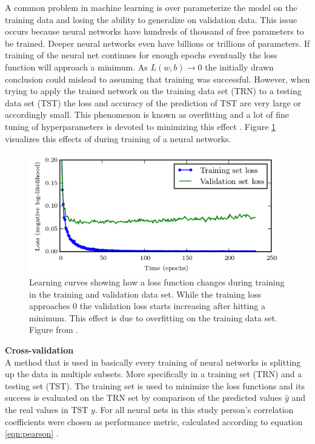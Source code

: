 A common problem in machine learning is over parameterize the model on the training data and losing
the ability to generalize on validation data. This issue occurs because neural networks have
hundreds of thousand of free parameters to be trained. Deeper neural networks even have billions or
trillions of parameters. If training of the neural net continues for enough epochs eventually the
loss function will approach a minimum. As $ L(w,b) \rightarrow 0 $ the initially drawn conclusion
could mislead to assuming that training was successful. However, when trying to apply the trained
network on the training data set (TRN) to a testing data set (TST) the loss and accuracy of the
prediction of TST are very large or accordingly small. This phenomenon is known as overfitting and a
lot of fine tuning of hyperparameters is devoted to minimizing this effect
\cite{tetko1995neural}. Figure \ref{fig:overfitting} visualizes this effects of during training
\cite{goodfellow2016deep} of a neural networks.

\begin{figure}[H]
  \centering \includegraphics[height=.35\textheight, width=1.1\textwidth]{Figures/overfitting} \decoRule
  \caption[Training vs. validation loss over time]{Learning curves showing how a loss function
    changes during training in the training and validation data set. While the training loss
    approaches 0 the validation loss starts increasing after hitting a minimum. This effect is due
    to overfitting on the training data set. Figure from \cite{goodfellow2016deep}.}
 \label{fig:overfitting}
\end{figure}

\textbf{Cross-validation} \\

A method that is used in basically every training of neural networks is splitting up the data in
multiple subsets. More specifically in a training set (TRN) and a testing set (TST). The training
set is used to minimize the loss functions and its success is evaluated on the TRN set by comparison
of the predicted values $\hat{y}$ and the real values in TST $y$. For all neural nets in this study
person's correlation coefficients were chosen as performance metric, calculated according to
equation \ref{eqn:pearson} \cite{soper1917distribution}.

